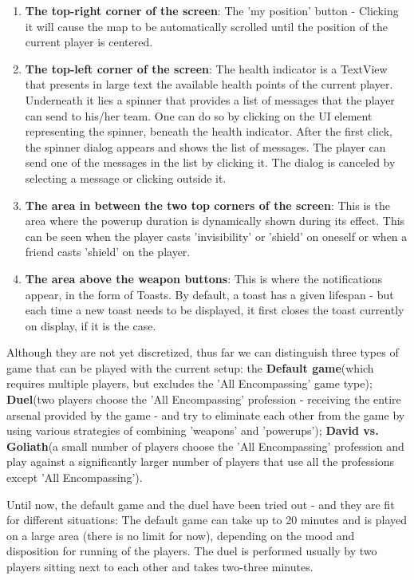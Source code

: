\begin{enumerate}
  \item\textbf{The top-right corner of the screen}: The 'my position' button - 
  Clicking it will cause the map to be automatically scrolled until the position
  of the current player is centered.
  
  \item\textbf{The top-left corner of the screen}: The health indicator is a
  TextView that presents in large text the available health points of the
  current player. Underneath it lies a spinner that provides a list of messages
  that the player can send to his/her team. One can do so by clicking on the UI
  element representing the spinner, beneath the health indicator. After the
  first click, the spinner dialog appears and shows the list of messages. The
  player can send one of the messages in the list by clicking it. The dialog is
  canceled by selecting a message or clicking outside it.
  
  \item\textbf{The area in between the two top corners of the screen}: This is
  the area where the powerup duration is dynamically shown during its effect.
  This can be seen when the player casts 'invisibility' or 'shield' on oneself
  or when a friend casts 'shield' on the player.
  
  \item\textbf{The area above the weapon buttons}: This is where the
  notifications appear, in the form of Toasts. By default, a toast has a given
  lifespan - but each time a new toast needs to be displayed, it first closes
  the toast currently on display, if it is the case.  
\end{enumerate}

Although they are not yet discretized, thus far we can distinguish three types
of game that can be played with the current setup: the \textbf{Default
game}(which requires multiple players, but excludes the 'All Encompassing' game
type); \textbf{Duel}(two players choose the 'All Encompassing' profession -
receiving the entire arsenal provided by the game - and try to eliminate
each other from the game by using various strategies of combining 'weapons' and
'powerups'); \textbf{David vs. Goliath}(a small number of players choose the
'All Encompassing' profession and play against a significantly larger number of
players that use all the professions except 'All Encompassing').\newline

Until now, the default game and the duel have been tried out - and they are
fit for different situations: The default game can take up to 20 minutes and is
played on a large area (there is no limit for now), depending on the mood and
disposition for running of the players. The duel is performed usually by two
players sitting next to each other and takes two-three minutes.\newline


